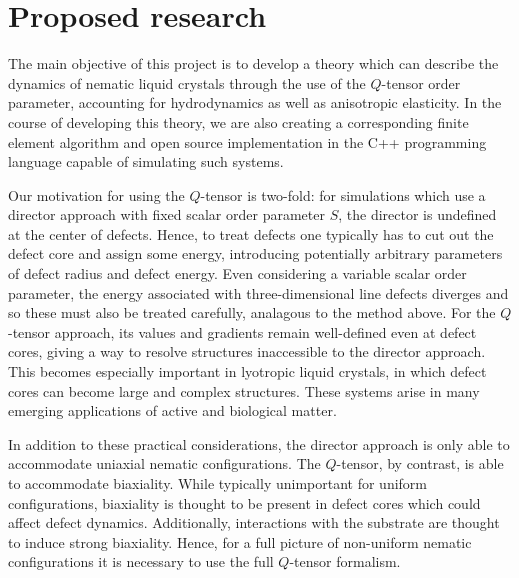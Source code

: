 \documentclass[reqno]{article}
\begin{document}
  \section{Proposed research}
  The main objective of this project is to develop a theory which can describe
  the dynamics of nematic liquid crystals through the use of the $Q$-tensor
  order parameter, accounting for hydrodynamics as well as anisotropic
  elasticity.
  In the course of developing this theory, we are also creating a corresponding
  finite element algorithm and open source implementation in the C++ programming
  language capable of simulating such systems.
  
  Our motivation for using the $Q$-tensor is two-fold: for simulations which use
  a director approach with fixed scalar order parameter $S$, the director is
  undefined at the center of defects.
  Hence, to treat defects one typically has to cut out the defect core and
  assign some energy, introducing potentially arbitrary parameters of defect
  radius and defect energy.
  Even considering a variable scalar order parameter, the energy associated with
  three-dimensional line defects diverges and so these must also be treated
  carefully, analagous to the method above.
  For the $Q$-tensor approach, its values and gradients remain well-defined even
  at defect cores, giving a way to resolve structures inaccessible to the
  director approach.
  This becomes especially important in lyotropic liquid crystals, in which
  defect cores can become large and complex structures.
  These systems arise in many emerging applications of active and biological
  matter.
  
  In addition to these practical considerations, the director approach is
  only able to accommodate uniaxial nematic configurations.
  The $Q$-tensor, by contrast, is able to accommodate biaxiality.
  While typically unimportant for uniform configurations, biaxiality is thought
  to be present in defect cores which could affect defect dynamics.
  Additionally, interactions with the substrate are thought to induce strong
  biaxiality.
  Hence, for a full picture of non-uniform nematic configurations it is
  necessary to use the full $Q$-tensor formalism.
\end{document}
